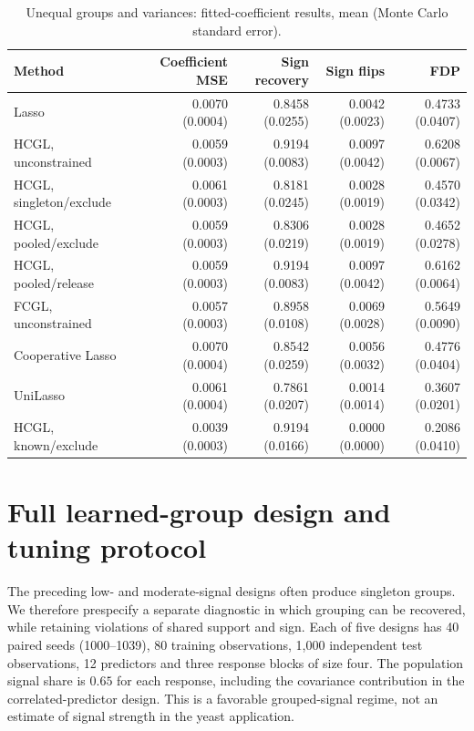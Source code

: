 \documentclass[11pt,a4paper]{article}
\begin{document}
\begin{table}[htbp]\centering\small\setlength{\tabcolsep}{4pt}
\caption{Unequal groups and variances: fitted-coefficient results, mean (Monte Carlo standard error).}
\begin{tabular}{lrrrr}\toprule
Method & Coefficient MSE & Sign recovery & Sign flips & FDP\\\midrule
Lasso & 0.0070 (0.0004) & 0.8458 (0.0255) & 0.0042 (0.0023) & 0.4733 (0.0407) \\
HCGL, unconstrained & 0.0059 (0.0003) & 0.9194 (0.0083) & 0.0097 (0.0042) & 0.6208 (0.0067) \\
HCGL, singleton/exclude & 0.0061 (0.0003) & 0.8181 (0.0245) & 0.0028 (0.0019) & 0.4570 (0.0342) \\
HCGL, pooled/exclude & 0.0059 (0.0003) & 0.8306 (0.0219) & 0.0028 (0.0019) & 0.4652 (0.0278) \\
HCGL, pooled/release & 0.0059 (0.0003) & 0.9194 (0.0083) & 0.0097 (0.0042) & 0.6162 (0.0064) \\
FCGL, unconstrained & 0.0057 (0.0003) & 0.8958 (0.0108) & 0.0069 (0.0028) & 0.5649 (0.0090) \\
Cooperative Lasso & 0.0070 (0.0004) & 0.8542 (0.0259) & 0.0056 (0.0032) & 0.4776 (0.0404) \\
UniLasso & 0.0061 (0.0004) & 0.7861 (0.0207) & 0.0014 (0.0014) & 0.3607 (0.0201) \\
HCGL, known/exclude & 0.0039 (0.0003) & 0.9194 (0.0166) & 0.0000 (0.0000) & 0.2086 (0.0410) \\
\bottomrule\end{tabular}
\label{tab:supplement-detail-6}
\end{table}

\FloatBarrier

\section{Full learned-group design and tuning protocol}\label{app:learned-protocol}

The preceding low- and moderate-signal designs often produce singleton groups.
We therefore prespecify a separate diagnostic in which grouping can be recovered,
while retaining violations of shared support and sign. Each of five designs has
40 paired seeds (1000--1039), 80 training observations, 1,000 independent test
observations, 12 predictors and three response blocks of size four. The population
signal share is $0.65$ for each response, including the covariance contribution
in the correlated-predictor design. This is a favorable grouped-signal regime,
not an estimate of signal strength in the yeast application.
\end{document}
